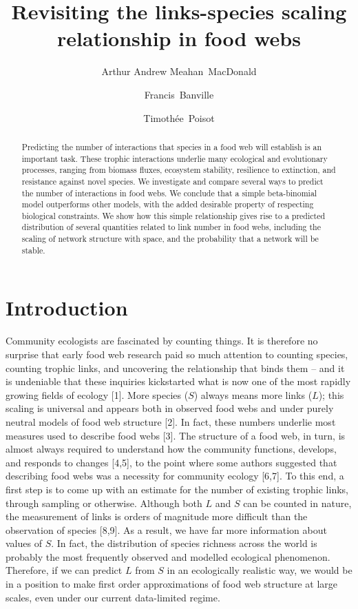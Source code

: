 \documentclass[12pt]{article}
\title{Revisiting the links-species scaling relationship in food webs}
\author[1,2]{Arthur Andrew Meahan~MacDonald}
\author[2,3]{Francis~Banville}
\author[2,3]{Timothée~Poisot}
\affil[1]{Université de Montréal, Département de Sciences Biologiques,
H2V 0B3, Montréal, QC, Canada}
\affil[2]{Québec Centre for Biodiversity Sciences, H3A 1B1, Montréal QC,
Canada}
\affil[3]{Université de Montréal, Département de Sciences Biologiques,
H2V 0B3, Montréal QC, Canada}
\begin{document}
\maketitle

\begin{abstract}
Predicting the number of interactions that species in a food web will
establish is an important task. These trophic interactions underlie many
ecological and evolutionary processes, ranging from biomass fluxes,
ecosystem stability, resilience to extinction, and resistance against
novel species. We investigate and compare several ways to predict the
number of interactions in food webs. We conclude that a simple
beta-binomial model outperforms other models, with the added desirable
property of respecting biological constraints. We show how this simple
relationship gives rise to a predicted distribution of several
quantities related to link number in food webs, including the scaling of
network structure with space, and the probability that a network will be
stable.
\end{abstract}



\linenumbers

\hypertarget{introduction}{%
\section{Introduction}\label{introduction}}

Community ecologists are fascinated by counting things. It is therefore
no surprise that early food web research paid so much attention to
counting species, counting trophic links, and uncovering the
relationship that binds them -- and it is undeniable that these
inquiries kickstarted what is now one of the most rapidly growing fields
of ecology {[}1{]}. More species (\(S\)) always means more links
(\(L\)); this scaling is universal and appears both in observed food
webs and under purely neutral models of food web structure {[}2{]}. In
fact, these numbers underlie most measures used to describe food webs
{[}3{]}. The structure of a food web, in turn, is almost always required
to understand how the community functions, develops, and responds to
changes {[}4,5{]}, to the point where some authors suggested that
describing food webs was a necessity for community ecology {[}6,7{]}. To
this end, a first step is to come up with an estimate for the number of
existing trophic links, through sampling or otherwise. Although both
\(L\) and \(S\) can be counted in nature, the measurement of links is
orders of magnitude more difficult than the observation of species
{[}8,9{]}. As a result, we have far more information about values of
\(S\). In fact, the distribution of species richness across the world is
probably the most frequently observed and modelled ecological
phenomenon. Therefore, if we can predict \(L\) from \(S\) in an
ecologically realistic way, we would be in a position to make first
order approximations of food web structure at large scales, even under
our current data-limited regime.
\end{document}
